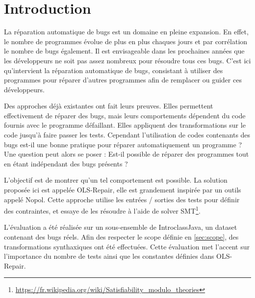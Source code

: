 \chapter*{Introduction}
	\thispagestyle{introduction}


\par La réparation automatique de bugs est un domaine en pleine expansion. En effet, le nombre de programmes évolue de plus en plus chaques jours et par corrélation le nombre de bugs également. Il est envisageable dans les prochaines années que les développeurs ne soit pas assez nombreux pour résoudre tous ces bugs. C'est ici qu'intervient la réparation automatique de bugs, consistant à utiliser des programmes pour réparer d'autres programmes afin de remplacer ou guider ces développeurs.  

\par Des approches déjà existantes\cite{genprog}\cite{semfix} ont fait leurs preuves. Elles permettent effectivement de réparer des bugs, mais leurs comportements dépendent du code fournis avec le programme défaillant. Elles appliquent des transformations sur le code jusqu'à faire passer les tests. Cependant l'utilisation de codes contenants des bugs est-il une bonne pratique pour réparer automatiquement un programme ? Une question peut alors se poser : Est-il possible de réparer des programmes tout en étant indépendant des bugs présents ?

\par L'objectif est de montrer qu'un tel comportement est possible. La solution proposée ici est appelée OLS-Repair, elle est grandement inspirée par un outils appelé Nopol\cite{nopol}. Cette approche utilise les entrées / sorties des tests pour définir des contraintes, et essaye de les résoudre à l'aide de solver SMT\footnote{\url{https://fr.wikipedia.org/wiki/Satisfiability_modulo_theories}}.


\par L'évaluation a été réalisée sur un sous-ensemble de IntroclassJava, un dataset contenant des bugs réels. Afin des respecter le scope définie en \ref{sec:scope}, des transformations synthaxiques ont été effectuées. Cette évaluation met l'accent sur l'importance du nombre de tests ainsi que les constantes définies dans OLS-Repair.